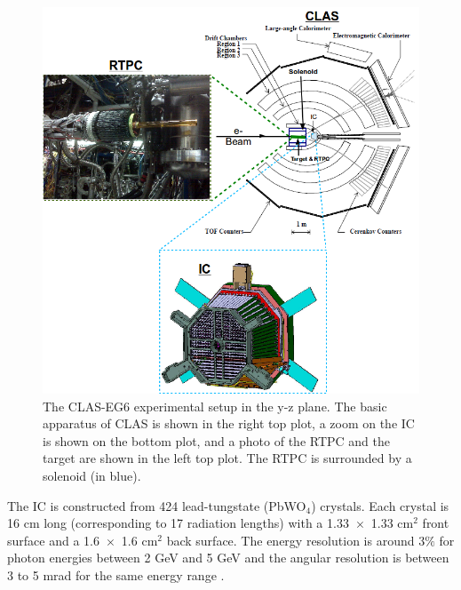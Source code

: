 \begin{figure}[tp]
\centering
\includegraphics[scale=0.54]{fig/clas_rtpc_3.png}
\caption{The CLAS-EG6 experimental setup in the y-z plane. The basic apparatus of CLAS is shown in the right top plot, a zoom on the IC is shown on the bottom plot, and a photo of the RTPC and the target are shown in the left top plot. The RTPC is surrounded by a solenoid (in blue).} 
\label{fig:CLAS_RTPC_2}
\end{figure} 

The IC is constructed from 424 lead-tungstate (PbWO$_{4}$) crystals. Each 
crystal is 16 cm long (corresponding to 17 radiation lengths) with a 
1.33~$\times$~1.33 cm$^2$ front surface and a 1.6~$\times$~1.6 cm$^2$ back 
surface. The energy resolution is around 3$\%$ for photon energies between 2 
GeV and 5 GeV and the angular resolution is between 3 to 5 mrad for the same 
energy range \cite{Hyon-suk}.

